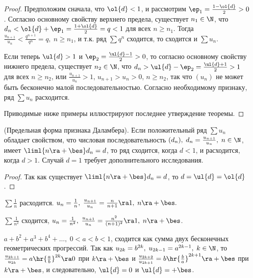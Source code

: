\documentclass[a4paper]{article}
\begin{document}
\begin{proof}
Предположим сначала, что $\ol{d}<1$, и рассмотрим $\ep_1 =
\frac{1-\ol{d}}2>0$. Согласно основному свойству верхнего предела,
существует $n_1\in\N$, что $d_n < \ol{d} + \ep_1 = \frac{1+\ol{d}}2
= q<1$ для всех $n\ge n_1$. Тогда $\frac{u_{n+1}}{u_n} <
\frac{q^{n+1}}{q^n}=q, \; n\ge n_1$, и т.к. ряд $\sum q^n$ сходится,
то сходится и $\sum u_n$.

Если теперь $\ul{d}>1$ и $\ep_2 = \frac{\ul{d}-1}2>0$, то согласно
основному свойству нижнего предела, существует $n_2\in\N$, что $d_n
> \ul{d} - \ep_2 = \frac{\ul{d}+1}2>1$ для всех $n\ge n_2$, или
$\frac{u_{n+1}}{u_n} > 1$, $u_{n+1}>u_n>0$, $n\ge n_2$, так что
$(u_n)$ не может быть бесконечно малой последовательностью. Согласно
необходимому признаку, ряд $\sum u_n$ расходится.

Приводимые ниже примеры иллюстрируют последнее утверждение теоремы.
\end{proof}

\begin{imp}
(Предельная форма признака Даламбера). Если положительный ряд $\sum
u_n$ обладает свойством, что числовая последовательность $(d_n), \;
d_n = \frac{u_{n+1}}{u_n}, \; n\in\N$, имеет $\liml{n\ra+\bes} d_n =
d$, то ряд сходится, когда $d<1$, и расходится, когда $d>1$. Случай
$d=1$ требует дополнительного исследования.
\end{imp}

\begin{proof}
Так как существует $\liml{n\ra+\bes}d_n=d$, то $d=\ul{d}=\ol{d}$.
\end{proof}

\begin{ex}
$\sum\frac1n$ расходится. $u_n=\frac1n, \;
\frac{u_{n+1}}{u_n}=\frac{n}{n+1}\ra1, \; n\ra+\bes.$
\end{ex}

\begin{ex}
$\sum\frac1{n^2}$ сходится, $u_n=\frac1{n^2}, \; \frac{u_{n+1}}{u_n}
= \frac{n^2}{(n+1)^2} \ra 1, \; n\ra+\bes$.
\end{ex}

\begin{ex}
$a+b^2+a^3+b^4+\ldots, \; 0<a<b<1$, сходится как сумма двух
бесконечных геометрических прогрессий. Так как $u_{2k}=b^{2k}, \;
u_{2k-1}=a^{2k-1}, \; k\in\N$, то $\frac{u_{2k+1}}{u_{2k}} =
a\hr{\frac{a}{b}}^{2k} \ra 0$ при $k\ra+\bes$ и
$\frac{u_{2k+2}}{u_{2k+1}} = b\hr{\frac{b}{a}}^{2k+1} \ra +\bes$ при
$k\ra+\bes$, и следовательно, $\ul{d}=0$ и $\ul{d}=+\bes$.
\end{ex}
\end{document}
